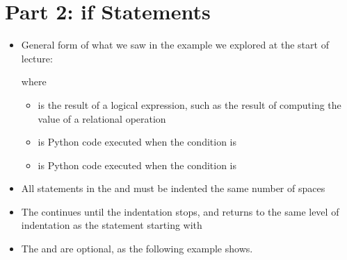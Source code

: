 \documentclass[letterpaper,10pt,english]{sphinxmanual}
\begin{document}
\section{Part 2: if Statements}
\label{\detokenize{lecture_notes/lec06_conditionals1:part-2-if-statements}}\begin{itemize}
\item {} 
General form of what we saw in the example we explored at the start
of lecture:

%
\begin{sphinxVerbatim}[commandchars=\\\{\}]
 
\end{sphinxVerbatim}

where
\begin{itemize}
\item {} 
 is the result of a logical expression, such as the
result of computing the value of a relational operation

\item {} 
 is Python code executed when the condition is 

\item {} 
 is Python code executed when the condition is

\end{itemize}

\item {} 
All statements in the  and  must be indented the
same number of spaces

\item {} 
The  continues until the indentation stops, and returns to
the same level of indentation as the statement starting with 

\item {} 
The  and  are optional, as the following example
shows.

\end{itemize}
\end{document}
